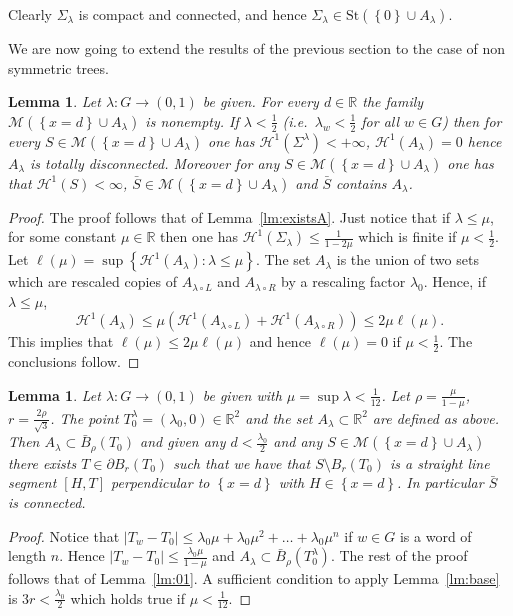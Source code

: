 \documentclass{amsart}
\newcommand{\RR}{\mathbb R}
\renewcommand{\H}{\mathcal H}
\newcommand{\abs}[1]{\left\vert #1 \right\vert}
\newcommand{\ENCLOSE}[1]{\left\{#1\right\}}
\newcommand{\St}{\mathrm{St}}
\newcommand{\M}{\mathcal{M}}
\renewcommand{\H}{\mathcal{H}}
\newtheorem{lemma}[theorem]{Lemma}
\theoremstyle{definition}
\theoremstyle{remark}
\begin{document}
{Clearly $\Sigma_\lambda$ is compact and connected, 
and hence $\Sigma_\lambda\in \St(\ENCLOSE{0}\cup A_\lambda)$.

We are now going to extend the results of the previous section to the case of non symmetric trees.
\begin{lemma}\label{lm2:existsA} 
  Let $\lambda\colon G\to (0,1)$ be given.
  For every $d\in \RR$ the family $\M(\ENCLOSE{x=d}\cup A_\lambda)$ is nonempty.
  If $\lambda < \frac 1 2$ (i.e.\ $\lambda_w < \frac 1 2$ for all $w\in G$)
  then for every $S\in \M(\ENCLOSE{x=d}\cup A_\lambda)$
  one has $\H^1(\Sigma^\lambda)<+\infty$, $\H^1(A_\lambda)=0$ hence $A_\lambda$ is totally disconnected.
  Moreover for any $S \in \M(\ENCLOSE{x=d}\cup A_\lambda)$ 
  one has that $\H^1(S)<\infty$,
  $\bar S\in \M(\ENCLOSE{x=d}\cup A_\lambda)$ and
  $\bar S$ contains $A_\lambda$.
\end{lemma}
\begin{proof}
  The proof follows that of Lemma~\ref{lm:existsA}. 
  Just notice that if $\lambda \le \mu$, for some constant 
  $\mu\in \RR$ then one has 
  $\H^1(\Sigma_\lambda)\le \frac{1}{1-2\mu}$ which is 
  finite if $\mu<\frac 1 2$.
  Let $\ell(\mu)=\sup\ENCLOSE{\H^1(A_\lambda)\colon \lambda \le \mu}$.
  The set $A_\lambda$ is the union 
  of two sets which are rescaled copies of $A_{\lambda\circ L}$ and $A_{\lambda\circ R}$
  by a rescaling factor $\lambda_0$.
  Hence, if $\lambda \le \mu$, 
  \[
    \H^1(A_\lambda) \le \mu (\H^1(A_{\lambda\circ L}) + \H^1(A_{\lambda\circ R}))
    \le 2\mu \ell(\mu).
  \]
  This implies that $\ell(\mu)\le 2\mu \ell(\mu)$ and hence $\ell(\mu)=0$ 
  if $\mu< \frac 1 2$.  
  The conclusions follow.
\end{proof}

\begin{lemma}\label{lm2:01}
Let $\lambda\colon G\to (0,1)$ be given 
with $\mu=\sup \lambda < \frac 1 {12}$.
Let $\rho = \frac{\mu}{1-\mu}$,
$r=\frac{2\rho}{\sqrt 3}$.
The point $T_0^\lambda=(\lambda_0,0)\in\RR^2$ and the 
set $A_\lambda\subset \RR^2$ are defined as above.
Then $A_\lambda\subset \bar B_\rho(T_0)$ and 
given any $d<\frac {\lambda_0} 2$ and any
$S\in \M(\ENCLOSE{x=d}\cup A_\lambda)$ 
there exists $T\in \partial B_r(T_0)$ such that
we have that $S\setminus B_r(T_0)$ is a straight line segment
$[H,T]$ perpendicular to $\ENCLOSE{x=d}$ 
with $H\in \ENCLOSE{x=d}$.
In particular $\bar S$ is connected.
\end{lemma}
%
\begin{proof}
  Notice that $\abs{T_w-T_0} \le \lambda_0\mu + \lambda_0\mu^2 + \dots + \lambda_0\mu^n$ 
  if $w\in G$ is a word of length $n$. 
  Hence $\abs{T_w-T_0}\le \frac{\lambda_0\mu}{1-\mu}$
  and $A_\lambda\subset \bar B_\rho(T^\lambda_0)$.
  The rest of the proof follows that of Lemma~\ref{lm:01}.
  A sufficient condition to apply Lemma~\ref{lm:base} is 
  $3r < \frac{\lambda_0}{2}$ which holds true if $\mu < \frac 1 {12}$.
\end{proof}

}
\end{document}
